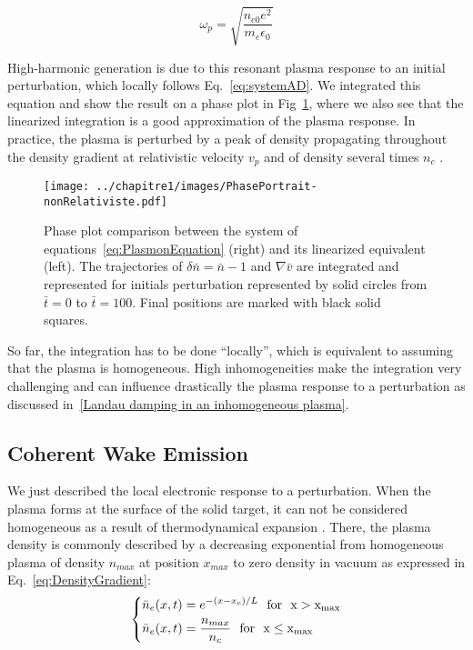 $$
\omega_p = \sqrt{\frac{n_{e0}e^2}{m_e\epsilon_0}}
$$


\noindent High-harmonic generation is due to this resonant plasma response to an initial perturbation, which locally follows Eq.~\ref{eq:systemAD}. We integrated this equation and show the result on a phase plot in Fig~\ref{fig:PhasePortrait-nonRelativiste}, where we also see that the linearized integration is a good approximation of the plasma response. In practice, the plasma is perturbed by a peak of density propagating throughout the density gradient at relativistic velocity $v_p$ and of density several times $n_c$ \cite{thaury2010high,TheseArnaud}.

\begin{figure}[H]
\centering
\texttt{[image: ../chapitre1/images/PhasePortrait-nonRelativiste.pdf]}\\
\caption{\label{fig:PhasePortrait-nonRelativiste}Phase plot comparison between the system of equations~\ref{eq:PlasmonEquation} (right) and 
its linearized equivalent (left). The trajectories of $\delta \bar{n} = \bar{n}-1$ and $\nabla\bar{v}$ are integrated and represented for initials perturbation represented by solid circles from $\bar{t} = 0$ to $\bar{t}=100$. Final positions are marked with black solid squares.}
\end{figure}

\noindent So far, the integration has to be done ``locally'', which is equivalent to assuming that the plasma is homogeneous. High inhomogeneities make the integration very challenging and can influence drastically the plasma response to a perturbation as discussed in~\ref{Landau damping in an inhomogeneous plasma}.


\subsection{Coherent Wake Emission}\label{subsubsection:Collective response of density gradient}
\label{subsection:Collective response of density gradient}\label{subsubsection:Collective response of density gradient}

We just described the local electronic response to a perturbation. When the plasma forms at the surface of the solid target, it can not be considered homogeneous as a result of thermodynamical expansion \cite{Kruer1988}.
There, the plasma density is commonly described by a decreasing exponential \cite{kruer1988physics,mora2003plasma} from homogeneous plasma of density $n_{max}$ at position $x_{max}$ to zero density in vacuum as expressed in Eq.~\ref{eq:DensityGradient}:
\begin{equation}
  \left\{
      \begin{aligned}
&\bar{n}_e(x,t) = e^{-(x-x_c)/L} \ \ \rm{for} \ \ x > x_{max}  \\
&\bar{n}_e(x,t) = \frac{n_{max}}{n_c} \ \ \rm{for} \ \ x \le x_{max}
      \end{aligned}
    \right.
\label{eq:DensityGradient}
\end{equation}

